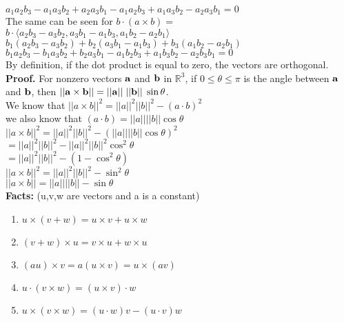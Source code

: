 \documentclass[11pt]{article}
\newcommand{\R}{\ensuremath{\mathbb R}}
\begin{document}
\begin{enumerate}
 \\
$a_1 a_2 b_3 - a_1 a_3 b_2 + a_2 a_3 b_1 - a_1 a_2 b_3 + a_1 a_3 b_2 - a_2 a_3 b_1= 0$
\\
The same can be seen for  $b \cdot (a \times b)=$
\\
$ b \cdot \langle a_2 b_3 - a_3 b_2, a_3 b_1 - a_1 b_3, a_1 b_2 - a_2 b_1 \rangle$
\\
 $b_1(a_2 b_3 - a_3 b_2) + b_2 (a_3 b_1 - a_1 b_3) + b_3 (a_1 b_2 - a_2 b_1)$
 \\
 $b_1 a_2 b_3 - b_1 a_3 b_2 + b_2 a_3 b_1 - a_1 b_2 b_3 + a_1 b_3 b_2 - a_2 b_3 b_1= 0$
 \\
 By definition, if the dot product is equal to zero, the vectors are orthogonal.
\\
\textbf{Proof.} For nonzero vectors ${\bf a}$ and ${\bf b}$ in $\R^3$, if $0 \le \theta \le \pi$ is the angle between ${\bf a}$ and ${\bf b}$, then $|| {\bf a} \times {\bf b}|| = || {\bf a}|| \; || {\bf b}|| \; \sin \theta$.
 \\
 We know that $|| a \times b||^2= ||a||^2 ||b||^2 - (a \cdot b)^2$
 \\
 we also know that $(a \cdot b) = ||a|| ||b|| \cos \theta $
 \\
 $|| a \times b||^2= ||a||^2 ||b||^2 - (||a|| ||b|| \cos \theta)^2$
 \\
 $=||a||^2 ||b||^2 - ||a||^2 ||b||^2 \cos^2 \theta $
 \\
 $=||a||^2 ||b||^2 - (1 - \cos^2 \theta) $
 \\
 $|| a \times b||^2=||a||^2 ||b||^2 - \sin^2 \theta $
 \\
 $|| a \times b||=||a|| ||b|| - \sin \theta $
\\
\textbf{Facts:} (u,v,w are vectors and a is a constant)
\begin{enumerate} 
\item $u \times (v+w)= u \times v + u \times w$
\item $(v+w) \times u= v \times u + w \times u$
\item $(au) \times v = a(u \times v)= u \times (av)$
\item $u \cdot (v \times w)= (u \times v) \cdot w$
\item $u \times (v \times w)= (u \cdot w)v- (u \cdot v)w $


\end{enumerate}



\end{enumerate}
\end{document}
